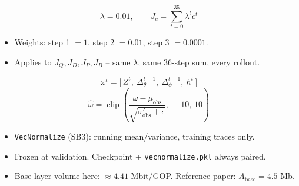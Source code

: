 \documentclass[aspectratio=169]{beamer}
\begin{document}
\begin{frame}
\[
\lambda = 0.01, \qquad J_c = \sum_{t=0}^{35} \lambda^t c^t
\]
\begin{itemize}
  \item Weights: step 1 $=1$, step 2 $=0.01$, step 3 $=0.0001$.
  \item Applies to $J_Q,J_D,J_P,J_B$ -- same $\lambda$, same 36-step sum, every rollout.
\end{itemize}
\end{frame}

\begin{frame}
\[
\omega^t = \bigl[\,Z^t,\ \Delta_\theta^{t-1},\ \Delta_\phi^{t-1},\ h^t\,\bigr]
\]
\[
\hat\omega = \operatorname{clip}\!\left(\frac{\omega-\mu_{\mathrm{obs}}}{\sqrt{\sigma_{\mathrm{obs}}^2+\epsilon}},\,-10,\,10\right)
\]
\begin{itemize}
  \item \texttt{VecNormalize} (SB3): running mean/variance, training traces only.
  \item Frozen at validation. Checkpoint + \texttt{vecnormalize.pkl} always paired.
  \item Base-layer volume here: $\approx4.41$ Mbit/GOP. Reference paper: $A_{\text{base}}=4.5$ Mb.
\end{itemize}
\end{frame}
\end{document}
